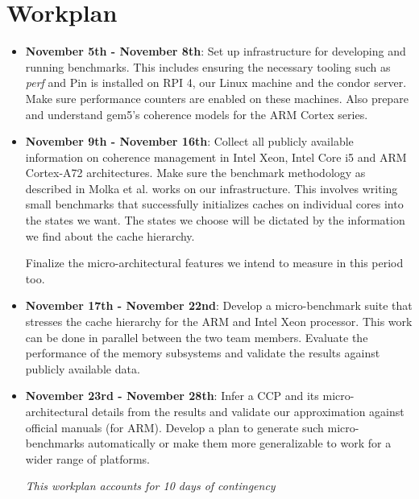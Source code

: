 \documentclass[11pt]{article}
\begin{document}
\section{Workplan}
\begin{itemize}
    \item \textbf{November 5th - November 8th}: Set up infrastructure for developing and running benchmarks. This includes ensuring the necessary tooling such as \textit{perf} and Pin is installed on RPI 4, our Linux machine and the condor server. Make sure performance counters are enabled on these machines. Also prepare and understand gem5's coherence models for the ARM Cortex series.
    \item \textbf{November 9th - November 16th}:
    Collect all publicly available information on coherence management in Intel Xeon, Intel Core i5 and ARM Cortex-A72 architectures. Make sure the benchmark methodology as described in Molka et al. \cite{molka2009memory} works on our infrastructure. This involves writing small benchmarks that successfully initializes caches on individual cores into the states we want. The states we choose will be dictated by the information we find about the cache hierarchy.

    Finalize the micro-architectural features we intend to measure in this period too.
    \item \textbf{November 17th - November 22nd}:
    Develop a micro-benchmark suite that stresses the cache hierarchy for the ARM and Intel Xeon processor. This work can be done in parallel between the two team members. Evaluate the performance of the memory subsystems and validate the results against publicly available data.
    \item \textbf{November 23rd - November 28th}: Infer a CCP and its micro-architectural details from the results and validate our approximation against official manuals (for ARM). Develop a plan to generate such micro-benchmarks automatically or make them more generalizable to work for a wider range of platforms.
    
    \textit{This workplan accounts for 10 days of contingency}
\end{itemize}

\newpage
\appendix



\end{document}
